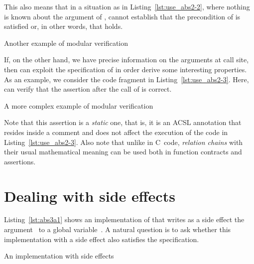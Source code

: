 This also means that in a situation as in Listing~\ref{lst:use_abs2-2},
where nothing is known about the argument of , 
\framacwp cannot establish that the precondition of  is satisfied
or, in other words, that  holds.

\begin{listing}[hbt]
\begin{minipage}{\textwidth}

\end{minipage}
\caption{\label{lst:use_abs2-2} Another example of modular verification}
\end{listing}

\FloatBarrier

If, on the other hand, we have precise information on the arguments at call site, then \framacwp can exploit the specification of 
 in order derive some interesting properties.
As an example, we consider the code fragment in Listing~\ref{lst:use_abs2-3}.
Here, \framacwp can verify that the assertion after 
the call of  is correct.


\begin{listing}[hbt]
\begin{minipage}{\textwidth}

\end{minipage}
\caption{\label{lst:use_abs2-3} A more complex example of modular verification}
\end{listing}

Note that this assertion is a \emph{static} one, that is, it is
an ACSL annotation that resides inside a comment and does not affect
the execution of the code in Listing~\ref{lst:use_abs2-3}.
Also note that unlike in C~code, \emph{relation chains} with their usual mathematical meaning can be used both in function contracts and assertions.


\section{Dealing with side effects}
\label{sec:side-effects}

Listing~\ref{lst:abs3a1} shows an implementation of 
that writes as a side effect the argument~ to a global variable~.
A natural question is to ask whether this implementation with a side effect
also satisfies the specification.

\begin{listing}[hbt]
\begin{minipage}{\textwidth}

\end{minipage}
\caption{\label{lst:abs3a1} An implementation with side effects}
\end{listing}

